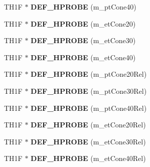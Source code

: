 \begin{DoxyCompactItemize}
\item 
\hypertarget{classHistos__Fake_a1c6f573421fc743cc2df3ed6d2fa69cf}{
TH1F $\ast$ {\bfseries DEF\_\-HPROBE} (m\_\-ptCone40)}
\label{classHistos__Fake_a1c6f573421fc743cc2df3ed6d2fa69cf}

\item 
\hypertarget{classHistos__Fake_a51b625c4778469e18c2525ae9108a041}{
TH1F $\ast$ {\bfseries DEF\_\-HPROBE} (m\_\-etCone20)}
\label{classHistos__Fake_a51b625c4778469e18c2525ae9108a041}

\item 
\hypertarget{classHistos__Fake_ab2ecaf136a0aacef0a38d02c1080992f}{
TH1F $\ast$ {\bfseries DEF\_\-HPROBE} (m\_\-etCone30)}
\label{classHistos__Fake_ab2ecaf136a0aacef0a38d02c1080992f}

\item 
\hypertarget{classHistos__Fake_a6fd8f5fee49c3fd553695164fee5dde8}{
TH1F $\ast$ {\bfseries DEF\_\-HPROBE} (m\_\-etCone40)}
\label{classHistos__Fake_a6fd8f5fee49c3fd553695164fee5dde8}

\item 
\hypertarget{classHistos__Fake_ac5d21675c8d4e2623ce77fa5bfd3bfc0}{
TH1F $\ast$ {\bfseries DEF\_\-HPROBE} (m\_\-ptCone20Rel)}
\label{classHistos__Fake_ac5d21675c8d4e2623ce77fa5bfd3bfc0}

\item 
\hypertarget{classHistos__Fake_a05365557b3a8265dc8ef871ff9c15dfe}{
TH1F $\ast$ {\bfseries DEF\_\-HPROBE} (m\_\-ptCone30Rel)}
\label{classHistos__Fake_a05365557b3a8265dc8ef871ff9c15dfe}

\item 
\hypertarget{classHistos__Fake_a487f7bf0cbc03b13cefbbf0dcee2a403}{
TH1F $\ast$ {\bfseries DEF\_\-HPROBE} (m\_\-ptCone40Rel)}
\label{classHistos__Fake_a487f7bf0cbc03b13cefbbf0dcee2a403}

\item 
\hypertarget{classHistos__Fake_abbfa1d2b7e2b89ba4f75f7dd7ab989a4}{
TH1F $\ast$ {\bfseries DEF\_\-HPROBE} (m\_\-etCone20Rel)}
\label{classHistos__Fake_abbfa1d2b7e2b89ba4f75f7dd7ab989a4}

\item 
\hypertarget{classHistos__Fake_a3e3c543053f95cc2eeba28e10d94d62b}{
TH1F $\ast$ {\bfseries DEF\_\-HPROBE} (m\_\-etCone30Rel)}
\label{classHistos__Fake_a3e3c543053f95cc2eeba28e10d94d62b}

\item 
\hypertarget{classHistos__Fake_af41a67c8e084a50693357cbfe1b3604a}{
TH1F $\ast$ {\bfseries DEF\_\-HPROBE} (m\_\-etCone40Rel)}
\label{classHistos__Fake_af41a67c8e084a50693357cbfe1b3604a}


\end{DoxyCompactItemize}
